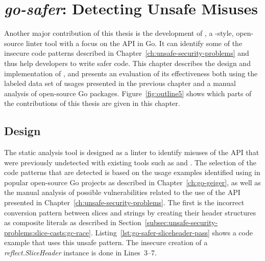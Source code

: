 
\chapter{\textit{go-safer}: Detecting Unsafe Misuses}\label{ch:go-safer}

Another major contribution of this thesis is the development of \toolSafer{}, a \toolVet{}-style, open-source linter
tool with a focus on the \unsafe{} \acrshort{API} in Go.
It can identify some of the insecure code patterns described in Chapter~\ref{ch:unsafe-security-problems} and thus help
developers to write safer code.
This chapter describes the design and implementation of \toolSafer{}, and presents an evaluation of its effectiveness
both using the labeled data set of \unsafe{} usages presented in the previous chapter and a manual analysis of
open-source Go packages.
Figure~\ref{fig:outline5} shows which parts of the contributions of this thesis are given in this chapter.





\section{Design}\label{sec:go-safer:design}

The \toolSafer{} static analysis tool is designed as a linter to identify  misuses of the \unsafe{}
\acrshort{API} that were previously undetected with existing tools such as \toolVet{} and \toolGosec{}.
The selection of the code patterns that are detected is based on the \unsafe{} usage examples identified using
\toolGeiger{} in popular open-source Go projects as described in Chapter~\ref{ch:go-geiger}, as well as the manual
analysis of possible vulnerabilities related to the use of the \unsafe{} \acrshort{API} presented in
Chapter~\ref{ch:unsafe-security-problems}.
The first is the incorrect conversion pattern between slices and strings by creating their header structures as
composite literals as described in Section~\ref{subsec:unsafe-security-problems:slice-casts:gc-race}.
Listing~\ref{lst:go-safer-sliceheader-pass} shows a code example that uses this unsafe pattern.
The insecure creation of a \textit{reflect.SliceHeader} instance is done in Lines~3--7.


